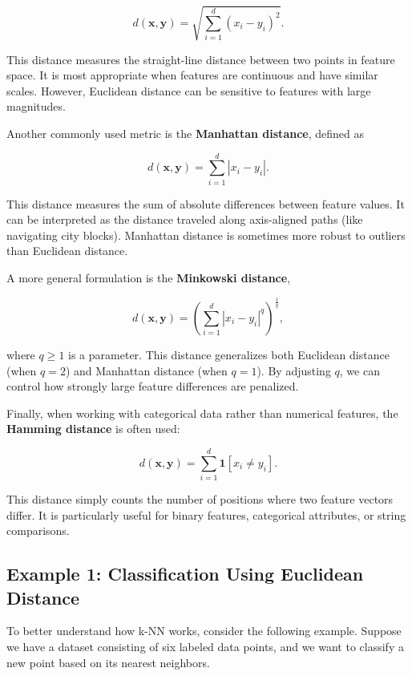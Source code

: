 \documentclass{article}
\begin{document}
\[
d(\mathbf{x}, \mathbf{y}) = \sqrt{\sum_{i=1}^{d} (x_i - y_i)^2}.
\]

This distance measures the straight-line distance between two points in feature space. It is most appropriate when features are continuous and have similar scales. However, Euclidean distance can be sensitive to features with large magnitudes.

Another commonly used metric is the \textbf{Manhattan distance}, defined as

\[
d(\mathbf{x}, \mathbf{y}) = \sum_{i=1}^{d} |x_i - y_i|.
\]

This distance measures the sum of absolute differences between feature values. It can be interpreted as the distance traveled along axis-aligned paths (like navigating city blocks). Manhattan distance is sometimes more robust to outliers than Euclidean distance.

A more general formulation is the \textbf{Minkowski distance},

\[
d(\mathbf{x}, \mathbf{y}) =
\left(
\sum_{i=1}^{d} |x_i - y_i|^q
\right)^{\frac{1}{q}},
\]

where $q \geq 1$ is a parameter. This distance generalizes both Euclidean distance (when \(q=2\)) and Manhattan distance (when \(q=1\)). By adjusting \(q\), we can control how strongly large feature differences are penalized.

Finally, when working with categorical data rather than numerical features, the \textbf{Hamming distance} is often used:

\[
d(\mathbf{x}, \mathbf{y}) =
\sum_{i=1}^{d} \mathbf{1}[x_i \neq y_i].
\]

This distance simply counts the number of positions where two feature vectors differ. It is particularly useful for binary features, categorical attributes, or string comparisons.

\subsection{Example 1: Classification Using Euclidean Distance}

To better understand how k-NN works, consider the following example. Suppose we have a dataset consisting of six labeled data points, and we want to classify a new point based on its nearest neighbors.
\end{document}
